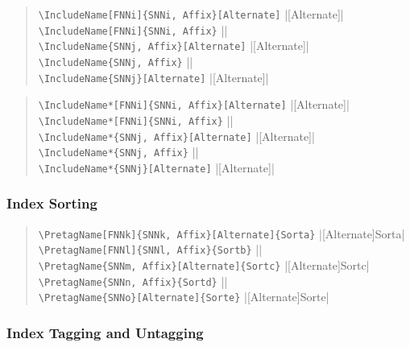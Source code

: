 \documentclass[oneside]{article}
\begin{document}
\begin{quote}
\Verb+\IncludeName[FNNi]{SNNi, Affix}[Alternate]+\dotfill
  |[Alternate]|\\
\Verb+\IncludeName[FNNi]{SNNi, Affix}+\dotfill
  ||\\
\Verb+\IncludeName{SNNj, Affix}[Alternate]+\dotfill
  |[Alternate]|\\
\Verb+\IncludeName{SNNj, Affix}+\dotfill
  ||\\
\Verb+\IncludeName{SNNj}[Alternate]+\dotfill
  |[Alternate]|
\end{quote}

\begin{quote}
\Verb+\IncludeName*[FNNi]{SNNi, Affix}[Alternate]+\dotfill
  |[Alternate]|\\
\Verb+\IncludeName*[FNNi]{SNNi, Affix}+\dotfill
  ||\\
\Verb+\IncludeName*{SNNj, Affix}[Alternate]+\dotfill
  |[Alternate]|\\
\Verb+\IncludeName*{SNNj, Affix}+\dotfill
  ||\\
\Verb+\IncludeName*{SNNj}[Alternate]+\dotfill
  |[Alternate]|
\end{quote}

\subsubsection{Index Sorting}

\begin{quote}
\Verb+\PretagName[FNNk]{SNNk, Affix}[Alternate]{Sorta}+\dotfill
  |[Alternate]{Sorta}|\\
\Verb+\PretagName[FNNl]{SNNl, Affix}{Sortb}+\dotfill
  ||\\
\Verb+\PretagName{SNNm, Affix}[Alternate]{Sortc}+\dotfill
  |[Alternate]{Sortc}|\\
\Verb+\PretagName{SNNn, Affix}{Sortd}+\dotfill
  ||\\
\Verb+\PretagName{SNNo}[Alternate]{Sorte}+\dotfill
  |[Alternate]{Sorte}|
\end{quote}

\subsubsection{Index Tagging and Untagging}
\end{document}
